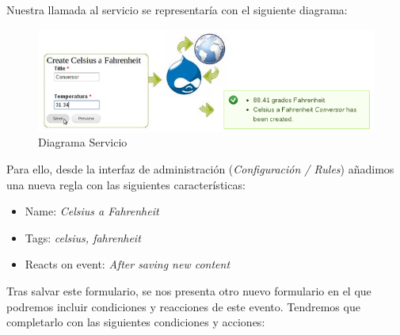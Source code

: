 Nuestra llamada al servicio se representaría con el siguiente diagrama:

\begin{figure}
  \centering
    \includegraphics[width=1\textwidth]{Assets/Soap/Imagenes/diagrama_soap.png}
  \caption{Diagrama Servicio}
\end{figure}

Para ello, desde la interfaz de administración (\textit{Configuración / Rules}) añadimos una nueva regla con 
las siguientes características:

\begin{itemize}
  \item Name: \textit{Celsius a Fahrenheit}
  \item Tags: \textit{celsius, fahrenheit}
  \item Reacts on event: \textit{After saving new content}  
\end{itemize}

Tras salvar este formulario, se nos presenta otro nuevo formulario en el que podremos incluir condiciones y 
reacciones de este evento. Tendremos que completarlo con las siguientes condiciones y acciones:

